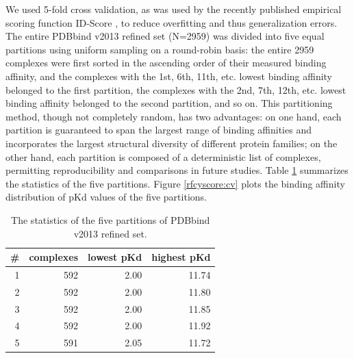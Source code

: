 We used 5-fold cross validation, as was used by the recently published empirical scoring function ID-Score \citep{1305}, to reduce overfitting and thus generalization errors. The entire PDBbind v2013 refined set (N=2959) was divided into five equal partitions using uniform sampling on a round-robin basis: the entire 2959 complexes were first sorted in the ascending order of their measured binding affinity, and the complexes with the 1st, 6th, 11th, etc. lowest binding affinity belonged to the first partition, the complexes with the 2nd, 7th, 12th, etc. lowest binding affinity belonged to the second partition, and so on. This partitioning method, though not completely random, has two advantages: on one hand, each partition is guaranteed to span the largest range of binding affinities and incorporates the largest structural diversity of different protein families; on the other hand, each partition is composed of a deterministic list of complexes, permitting reproducibility and comparisons in future studies. Table \ref{rfcyscore:partitions} summarizes the statistics of the five partitions. Figure \ref{rfcyscore:cv} plots the binding affinity distribution of pKd values of the five partitions.

\begin{table}
\caption{The statistics of the five partitions of PDBbind v2013 refined set.}
\label{rfcyscore:partitions}
\begin{tabular}{rrrr}
\hline
\# & complexes & lowest pKd & highest pKd\\
\hline
1 & 592 & 2.00 & 11.74\\
2 & 592 & 2.00 & 11.80\\
3 & 592 & 2.00 & 11.85\\
4 & 592 & 2.00 & 11.92\\
5 & 591 & 2.05 & 11.72\\
\hline
\end{tabular}
\end{table}

